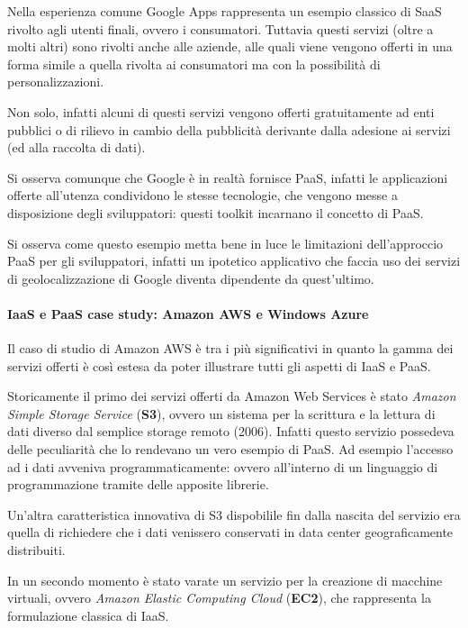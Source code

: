 Nella esperienza comune Google Apps rappresenta un esempio classico di
SaaS rivolto agli utenti finali, ovvero i consumatori. Tuttavia questi
servizi (oltre a molti altri) sono rivolti anche alle aziende, alle
quali viene vengono offerti in una forma simile a quella rivolta ai
consumatori ma con la possibilità di personalizzazioni.

Non solo, infatti alcuni di questi servizi vengono offerti gratuitamente
ad enti pubblici o di rilievo in cambio della pubblicità derivante dalla
adesione ai servizi (ed alla raccolta di dati).

Si osserva comunque che Google è in realtà fornisce PaaS, infatti le
applicazioni offerte all'utenza condividono le stesse tecnologie, che
vengono messe a disposizione degli sviluppatori: questi toolkit
incarnano il concetto di PaaS.

Si osserva come questo esempio metta bene in luce le limitazioni
dell'approccio PaaS per gli sviluppatori, infatti un ipotetico
applicativo che faccia uso dei servizi di geolocalizzazione di Google
diventa dipendente da quest'ultimo.

\paragraph{IaaS e PaaS case study: Amazon AWS e Windows
Azure}\label{iaas-e-paas-case-study-amazon-aws-e-windows-azure}

Il caso di studio di Amazon AWS è tra i più significativi in quanto la
gamma dei servizi offerti è così estesa da poter illustrare tutti gli
aspetti di IaaS e PaaS.

Storicamente il primo dei servizi offerti da Amazon Web Services è stato
\emph{Amazon Simple Storage Service} (\textbf{S3}), ovvero un sistema
per la scrittura e la lettura di dati diverso dal semplice storage
remoto (2006). Infatti questo servizio possedeva delle peculiarità che
lo rendevano un vero esempio di PaaS. Ad esempio l'accesso ad i dati
avveniva programmaticamente: ovvero all'interno di un linguaggio di
programmazione tramite delle apposite librerie.

Un'altra caratteristica innovativa di S3 dispobilile fin dalla nascita
del servizio era quella di richiedere che i dati venissero conservati in
data center geograficamente distribuiti.

In un secondo momento è stato varate un servizio per la creazione di
macchine virtuali, ovvero \emph{Amazon Elastic Computing Cloud}
(\textbf{EC2}), che rappresenta la formulazione classica di IaaS.

